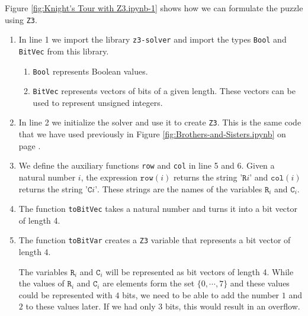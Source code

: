 Figure \ref{fig:Knight's Tour with Z3.ipynb-1} shows how we can formulate the puzzle using \texttt{Z3}.
\begin{enumerate}
\item In line 1 we import the library \texttt{z3-solver} and import the types \texttt{Bool} and
      \texttt{BitVec} from this library. 
      \begin{enumerate}
      \item \texttt{Bool} represents Boolean values.
      \item \texttt{BitVec} represents vectors of bits of a given length.  These vectors can be used to
            represent unsigned integers.
      \end{enumerate}
  
\item In line 2 we initialize the solver and use it to create \texttt{Z3}.
      This is the same code that we have used previously in Figure \ref{fig:Brothers-and-Sisters.ipynb} on page
      \pageref{fig:Brothers-and-Sisters.ipynb}.  
\item We define the auxiliary functions \texttt{row} and \texttt{col} in line 5 and 6.
      Given a natural number $i$, the expression $\mathtt{row}(i)$ returns the string $\texttt{'R}i\texttt{'}$
      and  $\mathtt{col}(i)$ returns the string  $\texttt{'C}i\texttt{'}$.  These strings are the names of the
      variables $\mathtt{R}_i$ and $\mathtt{C}_i$.
\item The function \texttt{toBitVec} takes a natural number and turns it into a bit vector of length 4.
\item The function \texttt{toBitVar} creates a \texttt{Z3} variable that represents a bit vector of length 4.

      The variables $\mathtt{R}_i$ and $\mathtt{C}_i$ will be represented as bit vectors of length 4.
      While the values of $\mathtt{R}_i$ and $\mathtt{C}_i$  are elements form the set $\{0, \cdots, 7\}$ and
      these values could be represented with $4$ bits, we need to be able to add the number $1$ and $2$ to
      these values later.  If we had only $3$ bits, this would result in an overflow. 
      

\end{enumerate}
